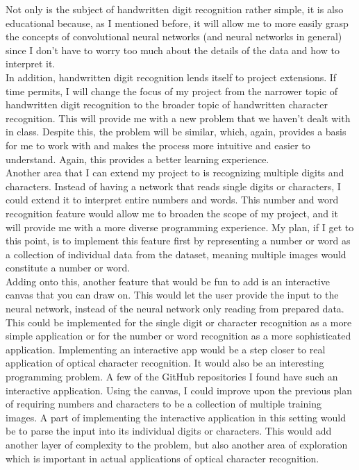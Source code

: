 \documentclass{article}
\begin{document}
Not only is the subject of handwritten digit recognition rather simple, it is also educational because, as I mentioned before, it will allow me to more easily grasp the concepts of convolutional neural networks (and neural networks in general) since I don't have to worry too much about the details of the data and how to interpret it.\\

In addition, handwritten digit recognition lends itself to project extensions. If time permits, I will change the focus of my project  from the narrower topic of handwritten digit recognition to the broader topic of handwritten character recognition. This will provide me with a new problem that we haven't dealt with in class. Despite this, the problem will be similar, which, again, provides a basis for me to work with and makes the process more intuitive and easier to understand. Again, this provides a better learning experience.\\

Another area that I can extend my project to is recognizing multiple digits and characters. Instead of having a network that reads single digits or characters, I could extend it to interpret entire numbers and words. This number and word recognition feature would allow me to broaden the scope of my project, and it will provide me with a more diverse programming experience. My plan, if I get to this point, is to implement this feature first by representing a number or word as a collection of individual data from the dataset, meaning multiple images would constitute a number or word.\\

Adding onto this, another feature that would be fun to add is an interactive canvas that you can draw on. This would let the user provide the input to the neural network, instead of the neural network only reading from prepared data. This could be implemented for the single digit or character recognition as a more simple application or for the number or word recognition as a more sophisticated application. Implementing an interactive app would be a step closer to real application of optical character recognition. It would also be an interesting programming problem. A few of the GitHub repositories I found have such an interactive application. Using the canvas, I could improve upon the previous plan of requiring numbers and characters to be a collection of multiple training images. A part of implementing the interactive application in this setting would be to parse the input into its individual digits or characters. This would add another layer of complexity to the problem, but also another area of exploration which is important in actual applications of optical character recognition.
\end{document}

